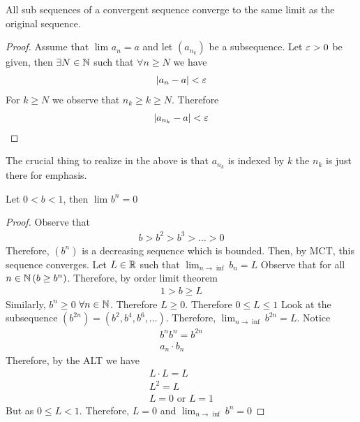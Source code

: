 \begin{theorem}
	All sub sequences of a convergent sequence converge to the same limit as the original sequence.
\end{theorem}

\begin{proof}
	Assume that $\lim_{} a_n = a$ and let $\left( a_{n_{k}} \right) $ be a subsequence. Let $\e > 0$ be given, then $\exists N \in \mathbb{N}$ such that $\forall n \ge N$ we have 
	\begin{align}
		\left|a_n - a\right| < \e
	\end{align}
	For $k \ge N$ we observe that $n_{k} \ge k \ge N$. Therefore
	\begin{align}
		\left|a_{n_{k}} - a\right| < \e
	\end{align}
\end{proof}

\begin{note}
	The crucial thing to realize in the above is that $a_{n_{k}}$ is indexed by $k$ the $n_k$ is just there for emphasis.
\end{note}

\begin{eg}
	Let $0 < b < 1$, then $\lim_{} b^{n} = 0$
\end{eg}

\begin{proof}
	Observe that
	\begin{align}
		b > b^{2} > b^{3} > \ldots > 0
	\end{align}
	Therefore, $\left( b^{n} \right) $ is a decreasing sequence which is bounded. Then, by MCT, this sequence converges. Let $L \in \mathbb{R}$ such that $\lim_{n \to \inf } b_n = L$ Observe that for all $n \in \mathbb{N}\left( b \ge b^{n} \right) $. Therefore, by order limit theorem 
	\begin{align}
		1 > b \ge L
	\end{align}
	Similarly, $b^{n} \ge 0$ $\forall n \in \mathbb{N}$. Therefore $L \ge 0$. Therefore $0 \le L \le 1$ 
	Look at the subsequence $\left( b^{2n} \right) = \left( b^{2}, b^{4}, b^{6}, \ldots \right) $. Therefore, $\lim_{n \to \inf } b^{2n} = L$. Notice
	\begin{align}
		b^{n} b^{n} = b^{2n} \\
		a_n \cdot b_n
	\end{align}
	Therefore, by the ALT we have
	\begin{align}
		L \cdot L = L \\
		L^{2} = L \\
		L = 0 \text{ or } L = 1
	\end{align}
	But as $0 \le L < 1$. Therefore, $L = 0$ and $\lim_{n \to \inf } b^{n} = 0$
\end{proof}
